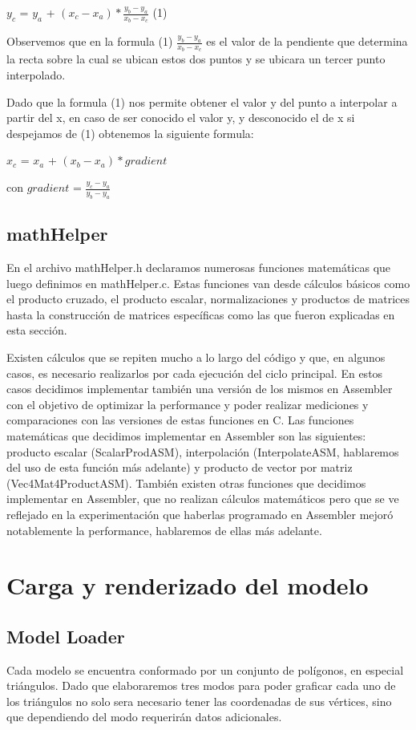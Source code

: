 \documentclass[a4paper]{article}
\begin{document}
$y_c$ = $y_a$ + $(x_c - x_a)*\frac{y_b - y_a}{x_b - x_c}$  (1)

Observemos que en la formula (1) $\frac{y_b - y_a}{x_b - x_c}$ es el valor de la pendiente que determina la recta sobre la cual se ubican estos dos puntos y se ubicara un tercer punto interpolado. 
\par Dado que la formula (1) nos permite obtener el valor y del punto a interpolar a partir del x, en caso de ser conocido el valor y, y desconocido el de x si despejamos de (1) obtenemos la siguiente formula:

$x_c$ = $x_a$ + $(x_b - x_a)*gradient$ 

con $gradient$  = $\frac{y_c - y_a}{y_b - y_a}$

\subsection{mathHelper}
En el archivo mathHelper.h declaramos numerosas funciones matemáticas que luego definimos en mathHelper.c. Estas funciones van desde cálculos básicos como el producto cruzado, el producto escalar, normalizaciones y productos de matrices hasta la construcción de matrices específicas como las que fueron explicadas en esta sección.
\par Existen cálculos que se repiten mucho a lo largo del código y que, en algunos casos, es necesario realizarlos por cada ejecución del ciclo principal. En estos casos decidimos implementar también una versión de los mismos en Assembler con el objetivo de optimizar la performance y poder realizar mediciones y comparaciones con las versiones de estas funciones en C. Las funciones matemáticas que decidimos implementar en Assembler son las siguientes: producto escalar (ScalarProdASM), interpolación (InterpolateASM, hablaremos del uso de esta función más adelante) y producto de vector por matriz (Vec4Mat4ProductASM). También existen otras funciones que decidimos implementar en Assembler, que no realizan cálculos matemáticos pero que se ve reflejado en la experimentación que haberlas programado en Assembler mejoró notablemente la performance, hablaremos de ellas más adelante.

\section{Carga y renderizado del modelo}

\subsection{Model Loader}
Cada modelo se encuentra conformado por un conjunto de polígonos, en especial triángulos. Dado que elaboraremos tres modos para poder graficar cada uno de los triángulos no solo sera necesario tener las coordenadas de sus vértices, sino que dependiendo del modo requerirán datos adicionales. 
\end{document}
